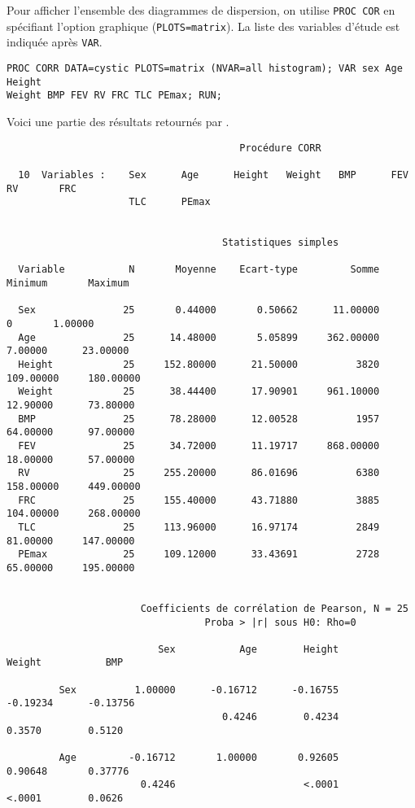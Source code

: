 Pour afficher l'ensemble des diagrammes de dispersion, on utilise
\texttt{PROC COR} en spécifiant l'option graphique (\verb|PLOTS=matrix|). La
liste des variables d'étude est indiquée après \texttt{VAR}.
\begin{verbatim}
PROC CORR DATA=cystic PLOTS=matrix (NVAR=all histogram); VAR sex Age Height
Weight BMP FEV RV FRC TLC PEmax; RUN;
\end{verbatim}
Voici une partie des résultats retournés par \SAS.
\begin{verbatim}
                                        Procédure CORR

  10  Variables :    Sex      Age      Height   Weight   BMP      FEV      RV       FRC
                     TLC      PEmax


                                     Statistiques simples

  Variable           N       Moyenne    Ecart-type         Somme       Minimum       Maximum

  Sex               25       0.44000       0.50662      11.00000             0       1.00000
  Age               25      14.48000       5.05899     362.00000       7.00000      23.00000
  Height            25     152.80000      21.50000          3820     109.00000     180.00000
  Weight            25      38.44400      17.90901     961.10000      12.90000      73.80000
  BMP               25      78.28000      12.00528          1957      64.00000      97.00000
  FEV               25      34.72000      11.19717     868.00000      18.00000      57.00000
  RV                25     255.20000      86.01696          6380     158.00000     449.00000
  FRC               25     155.40000      43.71880          3885     104.00000     268.00000
  TLC               25     113.96000      16.97174          2849      81.00000     147.00000
  PEmax             25     109.12000      33.43691          2728      65.00000     195.00000


                       Coefficients de corrélation de Pearson, N = 25
                                  Proba > |r| sous H0: Rho=0

                          Sex           Age        Height        Weight           BMP

         Sex          1.00000      -0.16712      -0.16755      -0.19234      -0.13756
                                     0.4246        0.4234        0.3570        0.5120

         Age         -0.16712       1.00000       0.92605       0.90648       0.37776
                       0.4246                      <.0001        <.0001        0.0626


\end{verbatim}
